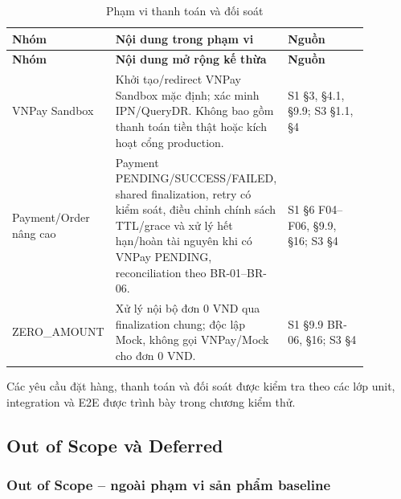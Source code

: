 \begingroup\small
\renewcommand{\arraystretch}{1.2}
\begin{longtable}{>{\raggedright\arraybackslash}p{0.20\linewidth}>{\raggedright\arraybackslash}p{0.43\linewidth}>{\raggedright\arraybackslash}p{0.25\linewidth}}
\caption{Phạm vi thanh toán và đối soát}\label{tab:auto-context-and-scope-4}\\
\hline
\textbf{Nhóm} & \textbf{Nội dung trong phạm vi} & \textbf{Nguồn} \\ \hline
\endfirsthead
\textbf{Nhóm} & \textbf{Nội dung mở rộng kế thừa} & \textbf{Nguồn} \\ \hline
\endhead
VNPay Sandbox & Khởi tạo/redirect VNPay Sandbox mặc định; xác minh IPN/QueryDR. Không bao gồm thanh toán tiền thật hoặc kích hoạt cổng production. & S1 §3, §4.1, §9.9; S3 §1.1, §4 \\ \hline
Payment/Order nâng cao & Payment PENDING/SUCCESS/FAILED, shared finalization, retry có kiểm soát, điều chỉnh chính sách TTL/grace và xử lý hết hạn/hoàn tài nguyên khi có VNPay PENDING, reconciliation theo BR-01--BR-06. & S1 §6 F04--F06, §9.9, §16; S3 §4 \\ \hline
ZERO\_AMOUNT & Xử lý nội bộ đơn 0 VND qua finalization chung; độc lập Mock, không gọi VNPay/Mock cho đơn 0 VND. & S1 §9.9 BR-06, §16; S3 §4 \\ \hline
\end{longtable}
\endgroup

Các yêu cầu đặt hàng, thanh toán và đối soát được kiểm tra theo các lớp unit, integration và E2E được trình bày trong chương kiểm thử.
\par

\subsection{Out of Scope và Deferred}

\subsubsection{Out of Scope -- ngoài phạm vi sản phẩm baseline}

